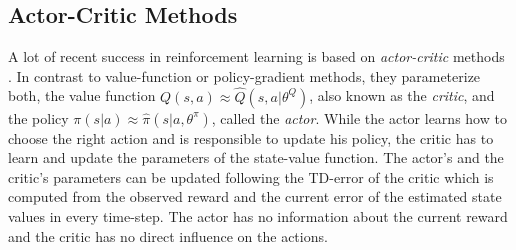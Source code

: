 \subsection{Actor-Critic Methods}
\label{sec:actor-critic}
A lot of recent success in reinforcement learning is based on \textit{actor-critic} methods \citep{konda2000actor}.
In contrast to value-function or policy-gradient methods, they parameterize both, the value function $Q(s,a) \approx \hat{Q}(s,a|\theta^Q)$, also known as the \textit{critic}, and the policy $\pi(s|a) \approx  \hat{\pi}(s|a,\theta^\pi)$, called the \textit{actor}.
While the actor learns how to choose the right action and is responsible to update his policy, the critic has to learn and update the parameters of the state-value function. The actor's and the 
critic's parameters can be updated following the TD-error of the critic which is computed from 
the observed reward and the current error of the estimated state values in every time-step. The actor has no information about the current reward and the critic has no direct influence on the actions.
\begin{comment}
 A pseudo-code for an actor-critic method using TD-errors [x] is shown in algorithm \ref{actor-critic-algo}.
\begin{algorithm}
	\caption{Episodic One-step Actor-Critic for Estimating $\pi(a|s,\theta^\pi) \approx \pi^*(a|s)$}\label{actor-critic-algo}
	\begin{algorithmic}
		\REQUIRE Differentiable policy parameterization $\pi(a|s,\theta^\pi)$
		\REQUIRE Differentiable action-value function parameterization $Q(s,a|\theta^Q)$
		\REQUIRE Random initial weights $\theta^\pi$ and $\theta^Q$
		\REQUIRE Step size parameters $\alpha^Q > 0$ and $\alpha^\pi >0$
		\REQUIRE Discount factor $\gamma$
		\FOR{episode $1$ \TO $M$}
		\STATE Get initial state s
		\STATE $i \leftarrow 1$
		\FOR{time-step 1 to T}
		\STATE{Draw action from actor: $a\sim\pi(s|a,\theta^\pi)$}
		\STATE{Do action a, observe reward r and successor state $s'$}
		\STATE{Calculate the TD-error:\\
		\qquad $\delta \leftarrow r + \gamma \max_a' Q(s',a'|\theta^Q) - Q(s,a|\theta^Q)$}
		\STATE{Update the weights:\\
		\qquad $\theta^Q \leftarrow \theta^Q + \alpha^Q\delta\nabla_{\theta^Q}Q(s,a|\theta^Q)$\\
		\qquad $\theta^\pi \leftarrow \theta^\pi + \alpha^\pi i \delta\nabla_{\theta^\pi}\log\pi(a|s,\theta^\pi)$}
		\STATE{Update:\\
		\qquad $i \leftarrow \gamma i$\\
		\qquad $s \leftarrow s'$}		
		\ENDFOR
		\ENDFOR
	\end{algorithmic}
\end{algorithm}
\end{comment}

